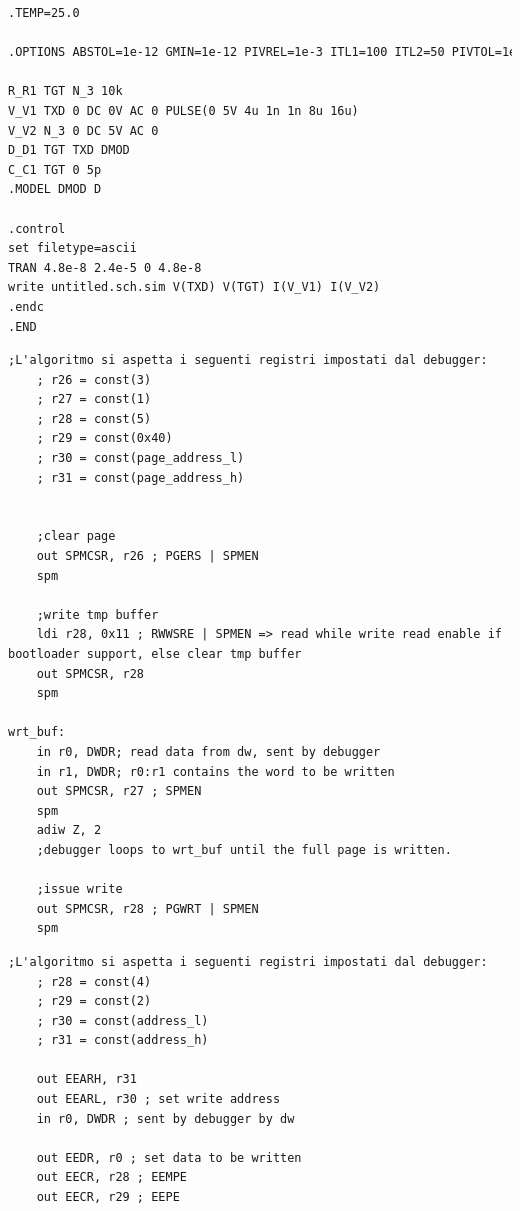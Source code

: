 \begin{lstlisting}[language=txt]
.TEMP=25.0

.OPTIONS ABSTOL=1e-12 GMIN=1e-12 PIVREL=1e-3 ITL1=100 ITL2=50 PIVTOL=1e-13 RELTOL=1e-3 VNTOL=1e-6 CHGTOL=1e-15 ITL4=10 METHOD=TRAP SRCSTEPS=0 TRTOL=7 NODE

R_R1 TGT N_3 10k 
V_V1 TXD 0 DC 0V AC 0 PULSE(0 5V 4u 1n 1n 8u 16u) 
V_V2 N_3 0 DC 5V AC 0 
D_D1 TGT TXD DMOD 
C_C1 TGT 0 5p 
.MODEL DMOD D

.control
set filetype=ascii
TRAN 4.8e-8 2.4e-5 0 4.8e-8 
write untitled.sch.sim V(TXD) V(TGT) I(V_V1) I(V_V2)
.endc
.END
\end{lstlisting}


\label{app:dw-flash-prog}

\begin{lstlisting}[language=AVR]
    ;L'algoritmo si aspetta i seguenti registri impostati dal debugger:
    ; r26 = const(3)
    ; r27 = const(1)
    ; r28 = const(5)
    ; r29 = const(0x40)
    ; r30 = const(page_address_l)
    ; r31 = const(page_address_h)


    ;clear page
    out SPMCSR, r26 ; PGERS | SPMEN
    spm

    ;write tmp buffer
    ldi r28, 0x11 ; RWWSRE | SPMEN => read while write read enable if bootloader support, else clear tmp buffer
    out SPMCSR, r28
    spm

wrt_buf:
    in r0, DWDR; read data from dw, sent by debugger
    in r1, DWDR; r0:r1 contains the word to be written
    out SPMCSR, r27 ; SPMEN
    spm
    adiw Z, 2
    ;debugger loops to wrt_buf until the full page is written.

    ;issue write
    out SPMCSR, r28 ; PGWRT | SPMEN
    spm
\end{lstlisting}

\label{app:dw-eeprom-prog}

\begin{lstlisting}[language=AVR]
    ;L'algoritmo si aspetta i seguenti registri impostati dal debugger:
    ; r28 = const(4)
    ; r29 = const(2)
    ; r30 = const(address_l)
    ; r31 = const(address_h)

    out EEARH, r31
    out EEARL, r30 ; set write address
    in r0, DWDR ; sent by debugger by dw

    out EEDR, r0 ; set data to be written
    out EECR, r28 ; EEMPE
    out EECR, r29 ; EEPE
\end{lstlisting}

